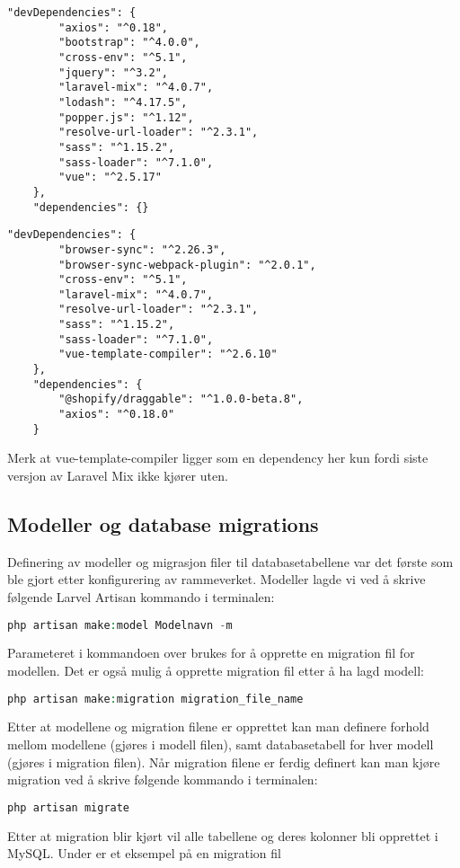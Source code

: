 \begin{lstlisting}[caption={Orginal package.json}]
    "devDependencies": {
        "axios": "^0.18",
        "bootstrap": "^4.0.0",
        "cross-env": "^5.1",
        "jquery": "^3.2",
        "laravel-mix": "^4.0.7",
        "lodash": "^4.17.5",
        "popper.js": "^1.12",
        "resolve-url-loader": "^2.3.1",
        "sass": "^1.15.2",
        "sass-loader": "^7.1.0",
        "vue": "^2.5.17"
    },
    "dependencies": {}
\end{lstlisting}

\begin{lstlisting}[caption={Siste package.json}]
    "devDependencies": {
        "browser-sync": "^2.26.3",
        "browser-sync-webpack-plugin": "^2.0.1",
        "cross-env": "^5.1",
        "laravel-mix": "^4.0.7",
        "resolve-url-loader": "^2.3.1",
        "sass": "^1.15.2",
        "sass-loader": "^7.1.0",
        "vue-template-compiler": "^2.6.10"
    },
    "dependencies": {
        "@shopify/draggable": "^1.0.0-beta.8",
        "axios": "^0.18.0"
    }
\end{lstlisting}
Merk at vue-template-compiler ligger som en dependency her kun fordi siste versjon av Laravel Mix ikke kjører uten.

\subsection{Modeller og database migrations}
Definering av modeller og migrasjon filer til databasetabellene var det første som ble gjort etter konfigurering av rammeverket.
Modeller lagde vi ved å skrive følgende Larvel Artisan kommando i terminalen:
\begin{lstlisting}[caption={Laravel Artisan kommando for oppretting av modell og migration},language=php]
    php artisan make:model Modelnavn -m
\end{lstlisting}
Parameteret  i kommandoen over brukes for å opprette en migration fil for modellen. Det er også mulig å opprette migration fil etter å ha lagd modell:
\begin{lstlisting}[caption={Laravel Artisan kommando for oppretting av migration fil},language=php]
    php artisan make:migration migration_file_name
\end{lstlisting}
Etter at modellene og migration filene er opprettet kan man definere forhold mellom modellene (gjøres i modell filen), samt databasetabell for hver modell (gjøres i migration filen).
Når migration filene er ferdig definert kan man kjøre migration ved å skrive følgende kommando i terminalen:
\begin{lstlisting}[caption={Laravel Artisan kommando for å kjøre migration},language=php]
    php artisan migrate
\end{lstlisting}
Etter at migration blir kjørt vil alle tabellene og deres kolonner bli opprettet i MySQL.
Under er et eksempel på en migration fil


